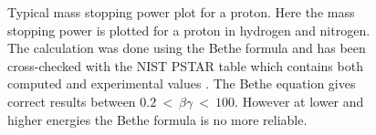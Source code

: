 \begin{figure}[!ht]
	
	\caption[Typical mass stopping power plot a proton]{Typical mass stopping power plot for a proton. Here the mass stopping power is plotted for a proton in hydrogen and nitrogen. The calculation was done using the Bethe formula and has been cross-checked with the NIST PSTAR table which contains both computed and experimental values \cite{Seltzer1993}. The Bethe equation gives correct results between \(0.2\ <\ \beta\gamma\ <\ 100\). However at lower and higher energies the Bethe formula is no more reliable.}
	\label{chap3:bethe1}
\end{figure}

